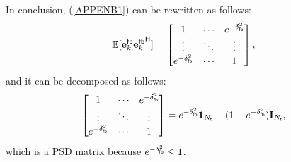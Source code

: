 \documentclass[draftclsnofoot, onecolumn, comsoc, 12pt]{IEEEtran}
\begin{document}
In conclusion, (\ref{APPENB1}) can be rewritten as follows:
\begin{align} \label{APPENB3}
   \mathbb{E}[{\mathbf{e}_{k}^{\sf{fb}}}{\mathbf{e}_{k}^{\sf{fb}}}^{\sf{H}}] = 
   \begin{bmatrix}
   1&\cdots&e^{-\delta_{\sf{fb}}^{2}} \\ 
   \vdots&\ddots&\vdots\\
   e^{-\delta_{\sf{fb}}^{2}}&\cdots&1
   \end{bmatrix},
\end{align}
and it can be decomposed as follows:
\begin{align} \label{APPENB4}
   \begin{bmatrix}
   1&\cdots&e^{-\delta_{\sf{fb}}^{2}} \\ 
   \vdots&\ddots&\vdots\\
   e^{-\delta_{\sf{fb}}^{2}}&\cdots&1
   \end{bmatrix} 
   = e^{-\delta_{\sf{fb}}^{2}}\mathbf{1}_{N_{{\sf{t}}}} + (1-e^{-\delta_{\sf{fb}}^{2}})\mathbf{I}_{N_{{\sf{t}}}},
\end{align}
which is a PSD matrix because $e^{-\delta_{\sf{fb}}^{2}} \leq 1$. 
\end{document}
